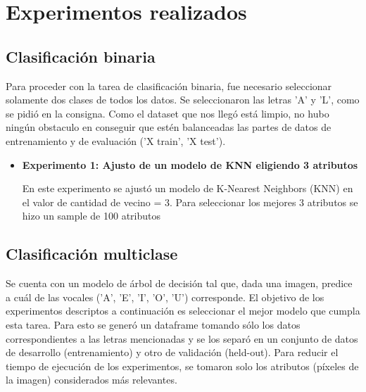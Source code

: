 \documentclass[11pt,a4paper, twocolumn]{article}
\begin{document}
\section{Experimentos realizados}
\subsection{Clasificación binaria}
Para proceder con la tarea de clasificación binaria, fue necesario seleccionar solamente dos clases de todos los datos. Se seleccionaron las letras 'A' y 'L', como se pidió en la consigna.
Como el dataset que nos llegó está limpio, no hubo ningún obstaculo en conseguir que estén balanceadas las partes de datos de entrenamiento y de evaluación ('X train', 'X test'). 
\begin{itemize}
    \item[]
       \textbf{Experimento 1: Ajusto de un modelo de KNN eligiendo 3 atributos}

En este experimento se ajustó un modelo de K-Nearest Neighbors (KNN) en el valor de cantidad de vecino = 3. 
Para seleccionar los mejores 3 atributos se hizo un sample de 100 atributos 
\end{itemize}

\subsection{Clasificación multiclase}
Se cuenta con un modelo de árbol de decisión tal que, dada una imagen, predice a cuál de las vocales ('A', 'E', 'I', 'O', 'U') corresponde. El objetivo de los experimentos descriptos a continuación es seleccionar el mejor modelo que cumpla esta tarea. Para esto se generó un dataframe tomando sólo los datos correspondientes a las letras mencionadas y se los separó en un conjunto de datos de desarrollo (entrenamiento) y otro de validación (held-out). Para reducir el tiempo de ejecución de los experimentos, se tomaron solo los atributos (píxeles de la imagen) considerados más relevantes.
\end{document}
